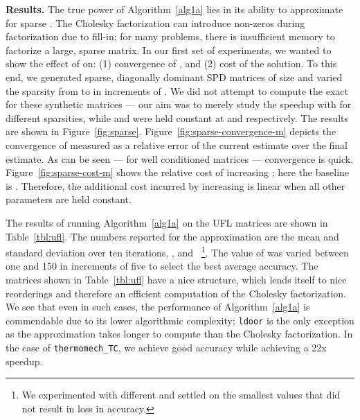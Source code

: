 \vspace{0.02in}\noindent \textbf{Results.}
The true power of Algorithm~\ref{alg1a} lies in its ability to approximate
 for sparse .
The Cholesky factorization can introduce  non-zeros during
factorization due to fill-in; for many problems, there is insufficient
memory to factorize a large, sparse matrix.
In our first set of experiments, we wanted to show the effect of  on: (1)
convergence of , and (2) cost of the solution.
To this end, we generated sparse, diagonally dominant SPD matrices of size
 and varied the sparsity from  to  in increments of
.
We did not attempt to compute the exact  for these synthetic
matrices --- our aim was to merely study the speedup with  for different
sparsities, while  and  were held constant at  and 
respectively.
The results are shown in Figure~\ref{fig:sparse}.
Figure~\ref{fig:sparse-convergence-m} depicts the convergence of
 measured as a relative error of the current estimate over the
final estimate.
As can be seen --- for well conditioned matrices --- convergence is quick.
Figure~\ref{fig:sparse-cost-m} shows the relative cost of increasing ; here
the baseline is .
Therefore, the additional cost incurred by increasing  is linear when
all other parameters are held constant.

The results of running Algorithm~\ref{alg1a} on the UFL matrices are shown in
Table~\ref{tbl:ufl}.
The numbers reported for the approximation are the mean and standard deviation
over ten iterations, , and ~\footnote{We experimented with different
 and settled on the smallest values that did not result in loss in
accuracy.}.
The value of  was varied between one and 150 in increments of five to select the best
average accuracy.
The matrices shown in Table~\ref{tbl:ufl} have a nice structure, which lends
itself to nice reorderings and therefore an efficient computation of the Cholesky factorization.
We see that even in such cases, the performance of Algorithm~\ref{alg1a} is
commendable due to its lower
algorithmic complexity; \texttt{ldoor} is the only exception as the
approximation takes longer to compute than the Cholesky factorization.
In the case of \texttt{thermomech\_TC}, we achieve good accuracy while achieving
a 22x speedup.
%
